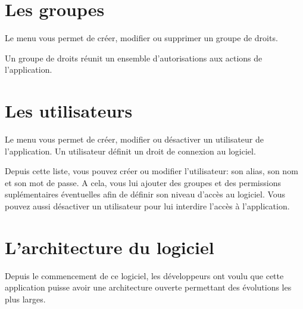\documentclass[a4paper,10pt,oneside,french]{sphinxmanual}
\begin{document}
\section{Les groupes}
\label{\detokenize{CORE/groups:les-groupes}}\label{\detokenize{CORE/groups::doc}}
Le menu  vous permet de créer, modifier ou supprimer un groupe de droits.

\noindent{}

Un groupe de droits réunit un ensemble d’autorisations aux actions de l’application.

\noindent{}


\section{Les utilisateurs}
\label{\detokenize{CORE/users::doc}}\label{\detokenize{CORE/users:les-utilisateurs}}
Le menu  vous
permet de créer, modifier ou désactiver un utilisateur de l’application. Un
utilisateur définit un droit de connexion au logiciel.

\noindent{}

Depuis cette liste, vous pouvez créer ou modifier l’utilisateur: son
alias, son nom et son mot de passe. A cela, vous lui ajouter des groupes et
des permissions suplémentaires éventuelles afin de définir son niveau
d’accès au logiciel. Vous pouvez aussi désactiver un utilisateur pour lui
interdire l’accès à l’application.

\noindent{}

\noindent{}


\section{L’architecture du logiciel}
\label{\detokenize{CORE/architecture::doc}}\label{\detokenize{CORE/architecture:l-architecture-du-logiciel}}
Depuis le commencement de ce logiciel, les développeurs ont voulu que cette application puisse avoir une architecture ouverte permettant des évolutions les plus larges.



\renewcommand{\indexname}{Index}
\printindex
\end{document}
